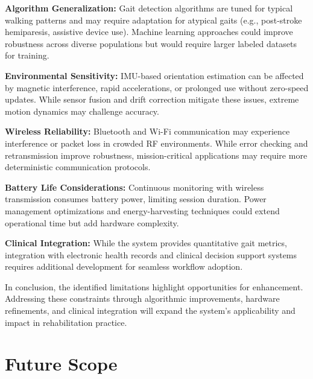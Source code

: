 \documentclass[12pt,a4paper]{report}
\begin{document}
\textbf{Algorithm Generalization:}  
Gait detection algorithms are tuned for typical walking patterns and may require adaptation for atypical gaits (e.g., post-stroke hemiparesis, assistive device use). Machine learning approaches could improve robustness across diverse populations but would require larger labeled datasets for training.

\vspace{0.3cm}

\textbf{Environmental Sensitivity:}  
IMU-based orientation estimation can be affected by magnetic interference, rapid accelerations, or prolonged use without zero-speed updates. While sensor fusion and drift correction mitigate these issues, extreme motion dynamics may challenge accuracy.

\vspace{0.3cm}

\textbf{Wireless Reliability:}  
Bluetooth and Wi-Fi communication may experience interference or packet loss in crowded RF environments. While error checking and retransmission improve robustness, mission-critical applications may require more deterministic communication protocols.

\vspace{0.3cm}

\textbf{Battery Life Considerations:}  
Continuous monitoring with wireless transmission consumes battery power, limiting session duration. Power management optimizations and energy-harvesting techniques could extend operational time but add hardware complexity.

\vspace{0.3cm}

\textbf{Clinical Integration:}  
While the system provides quantitative gait metrics, integration with electronic health records and clinical decision support systems requires additional development for seamless workflow adoption.

\vspace{0.5cm}

In conclusion, the identified limitations highlight opportunities for enhancement. Addressing these constraints through algorithmic improvements, hardware refinements, and clinical integration will expand the system's applicability and impact in rehabilitation practice.

\section{Future Scope}
\end{document}
